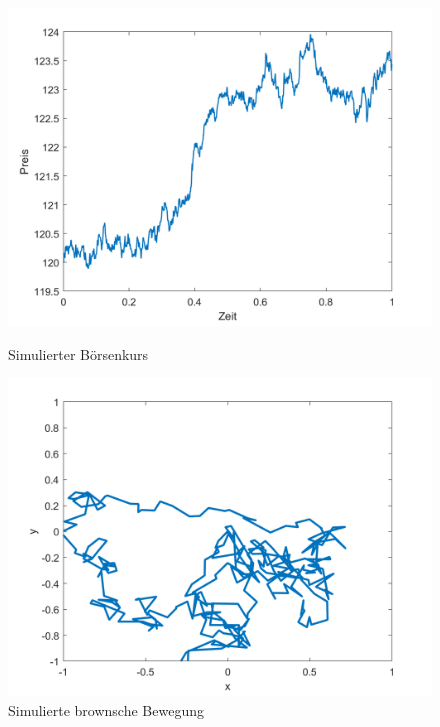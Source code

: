 \begin{figure}
	\centering
	\begin{minipage}{0.45\textwidth}
		\centering
		\includegraphics[width=\linewidth]{papers/brown/images/simulierter-boersenkurs.png}
		\caption{Simulierter Börsenkurs}
		\label{brown:1Dbrownian}
	\end{minipage}
	\hspace{0.05\linewidth}
	\begin{minipage}{0.45\textwidth}
		\centering
		\includegraphics[width=\linewidth]{papers/brown/images/simulierte-bronsche-bewegung.png}
		\caption{Simulierte brownsche Bewegung}
		\label{brown:2Dbrownian}
	\end{minipage}
\end{figure}


